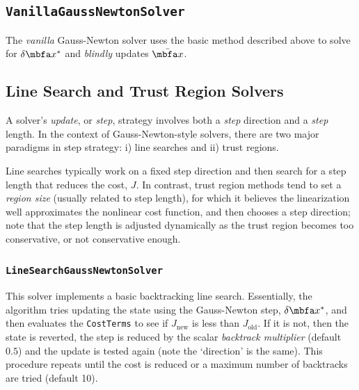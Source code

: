 \documentclass[10pt,letterpaper,fleqn,oneside]{article}
\newcommand{\code}[1]{\texttt{#1}}
\begin{document}
\subsection{\code{VanillaGaussNewtonSolver}}

The \emph{vanilla} Gauss-Newton solver uses the basic method described above to solve for $\delta\mbf{x}^*$ and \emph{blindly} updates $\mbfbar{x}$. 

\subsection{Line Search and Trust Region Solvers}

A solver's \emph{update}, or \emph{step}, strategy involves both a \emph{step} direction and a \emph{step} length. 
In the context of Gauss-Newton-style solvers, there are two major paradigms in step strategy: i) line searches and ii) trust regions. 

Line searches typically work on a fixed step direction and then search for a step length that reduces the cost, $J$. 
In contrast, trust region methods tend to set a \emph{region size} (usually related to step length), for which it believes the linearization well approximates the nonlinear cost function, and then chooses a step direction; 
note that the step length is adjusted dynamically as the trust region becomes too conservative, or not conservative enough.

\subsubsection{\code{LineSearchGaussNewtonSolver}}

This solver implements a basic backtracking line search.
Essentially, the algorithm tries updating the state using the Gauss-Newton step, $\delta\mbf{x}^*$, and then evaluates the \code{CostTerms} to see if $J_\text{new}$ is less than  $J_\text{old}$.
If it is not, then the state is reverted, the step is reduced by the scalar \emph{backtrack multiplier} (default $0.5$) and the update is tested again (note the `direction' is the same).
This procedure repeats until the cost is reduced or a maximum number of backtracks are tried (default 10).

\end{document}

